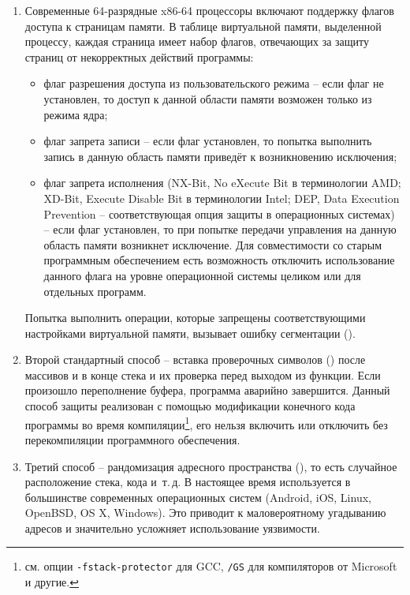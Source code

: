 \begin{enumerate}
	\item Современные 64-разрядные x86-64 процессоры включают поддержку флагов доступа к страницам памяти. В таблице виртуальной памяти, выделенной процессу, каждая страница имеет набор флагов, отвечающих за защиту страниц от некорректных действий программы:
		\begin{itemize}
		\item флаг разрешения доступа из пользовательского режима -- если флаг не установлен, то доступ к данной области памяти возможен только из режима ядра;
		\item флаг запрета записи -- если флаг установлен, то попытка выполнить запись в данную область памяти приведёт к возникновению исключения;
		\item флаг запрета исполнения (NX-Bit, No eXecute Bit в терминологии AMD; XD-Bit, Execute Disable Bit в терминологии Intel; DEP, Data Execution Prevention -- соответствующая опция защиты в операционных системах) -- если флаг установлен, то при попытке передачи управления на данную область памяти возникнет исключение. Для совместимости со старым программным обеспечением есть возможность отключить использование данного флага на уровне операционной системы целиком или для отдельных программ.
	\end{itemize}
	Попытка выполнить операции, которые запрещены соответствующими настройками виртуальной памяти, вызывает ошибку сегментации ().

    \item Второй стандартный способ -- вставка проверочных символов () после массивов и в конце стека и их проверка перед выходом из функции. Если произошло переполнение буфера, программа аварийно завершится. Данный способ защиты реализован с помощью модификации конечного кода программы во время компиляции\footnote{см. опции \texttt{-fstack-protector} для GCC, \texttt{/GS} для компиляторов от Microsoft и другие.}, его нельзя включить или отключить без перекомпиляции программного обеспечения.

    \item Третий способ -- рандомизация адресного пространства (), то есть случайное расположение стека, кода и~т.\,д. В настоящее время используется в большинстве современных операционных систем (Android, iOS, Linux, OpenBSD, OS X, Windows). Это приводит к маловероятному угадыванию адресов и значительно усложняет использование уязвимости.
\end{enumerate}

